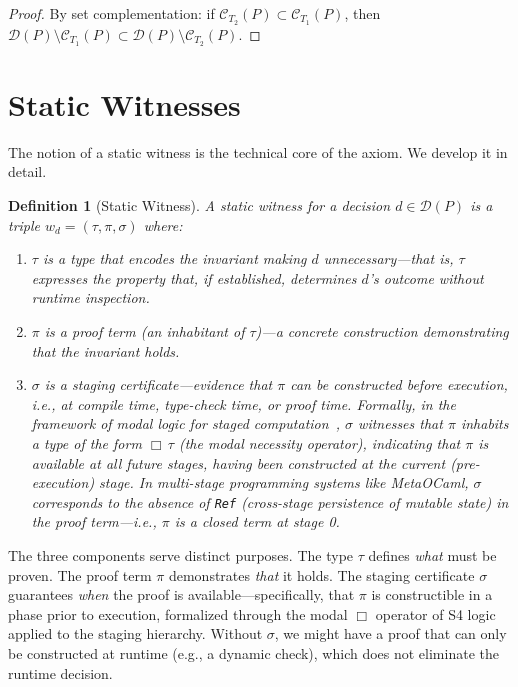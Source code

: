 \documentclass[11pt]{article}
\newtheorem{definition}[theorem]{Definition}
\newcommand{\DP}{\mathcal{D}(P)}
\newcommand{\witness}{w_d}
\begin{document}
\begin{proof}
By set complementation: if $\mathcal{C}_{T_2}(P) \subset \mathcal{C}_{T_1}(P)$,
then $\DP \setminus \mathcal{C}_{T_1}(P) \subset \DP \setminus \mathcal{C}_{T_2}(P)$.
\end{proof}


\section{Static Witnesses}
\label{sec:witnesses}

The notion of a static witness is the technical core of the axiom. We develop it in
detail.

\begin{definition}[Static Witness]
\label{def:witness}
A \emph{static witness} for a decision $d \in \DP$ is a triple $\witness = (\tau, \pi, \sigma)$
where:
\begin{enumerate}[nosep]
  \item $\tau$ is a \emph{type} that encodes the invariant making $d$ unnecessary---that is,
        $\tau$ expresses the property that, if established, determines $d$'s outcome without
        runtime inspection.
  \item $\pi$ is a \emph{proof term} (an inhabitant of $\tau$)---a concrete construction
        demonstrating that the invariant holds.
  \item $\sigma$ is a \emph{staging certificate}---evidence that $\pi$ can be constructed
        \emph{before execution}, i.e., at compile time, type-check time, or proof time.
        Formally, in the framework of modal logic for staged computation~\cite{davies2001modal},
        $\sigma$ witnesses that $\pi$ inhabits a type of the form $\Box\,\tau$ (the modal
        necessity operator), indicating that $\pi$ is available at \emph{all} future stages,
        having been constructed at the current (pre-execution) stage. In multi-stage
        programming systems like MetaOCaml, $\sigma$ corresponds to the absence of
        \texttt{Ref} (cross-stage persistence of mutable state) in the proof term---i.e.,
        $\pi$ is a \emph{closed} term at stage 0.
\end{enumerate}
\end{definition}

The three components serve distinct purposes. The type $\tau$ defines \emph{what} must
be proven. The proof term $\pi$ demonstrates \emph{that} it holds. The staging
certificate $\sigma$ guarantees \emph{when} the proof is available---specifically, that
$\pi$ is constructible in a phase prior to execution, formalized through the modal
$\Box$ operator of S4 logic applied to the staging hierarchy. Without $\sigma$,
we might have a proof that can only be constructed at runtime (e.g., a dynamic check),
which does not eliminate the runtime decision.
\end{document}
